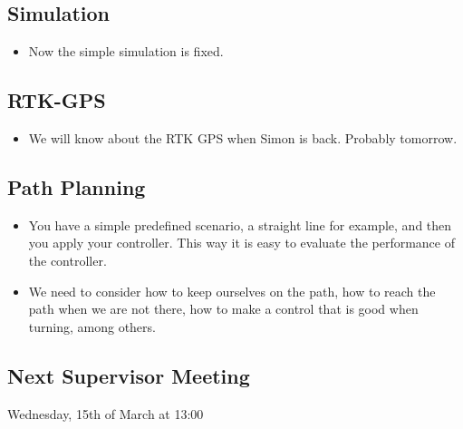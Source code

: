 \subsection{Simulation}
\begin{itemize}
	\item Now the simple simulation is fixed. 
\end{itemize}
\subsection{RTK-GPS}
\begin{itemize}
	\item We will know about the RTK GPS when Simon is back. Probably tomorrow.
\end{itemize}
\subsection{Path Planning}
\begin{itemize}
	\item You have a simple predefined scenario, a straight line for example, and then you apply your controller. This way it is easy to evaluate the performance of the controller.
	\item We need to consider how to keep ourselves on the path, how to reach the path when we are not there, how to make a control that is good when turning, among others.
\end{itemize}
\subsection{Next Supervisor Meeting}
Wednesday, 15th of March at 13:00

